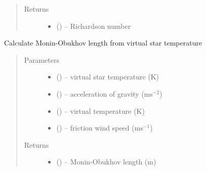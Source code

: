 \documentclass[letterpaper,10pt,english]{sphinxmanual}
\begin{document}
\begin{fulllineitems}
\begin{quote}
\begin{description}
\item[{Returns}] \leavevmode
\begin{itemize}
\item {} 
(\href{https://docs.python.org/3/library/functions.html\#float}{}) -- Richardson number
\end{itemize}
\end{description}\end{quote}

\end{fulllineitems}


\begin{fulllineitems}
\label{\detokenize{index:flux_subs.get_Ltsrv}}
Calculate Monin-Obukhov length from virtual star temperature

\begin{quote}\begin{description}
\item[{Parameters}] \leavevmode
\begin{itemize}
\item {} 
 (\href{https://docs.python.org/3/library/functions.html\#float}{}) -- virtual star temperature (K)

\item {} 
 (\href{https://docs.python.org/3/library/functions.html\#float}{}) -- acceleration of gravity (ms$^{-2}$)

\item {} 
(\href{https://docs.python.org/3/library/functions.html\#float}{}) -- virtual temperature (K)

\item {} 
(\href{https://docs.python.org/3/library/functions.html\#float}{}) --  friction wind speed (ms$^{-1}$)
\end{itemize}


\item[{Returns}] \leavevmode
\begin{itemize}
\item {} 
(\href{https://docs.python.org/3/library/functions.html\#float}{}) -- Monin-Obukhov length (m)

\end{itemize}
\end{description}\end{quote}

\end{fulllineitems}
\end{document}
